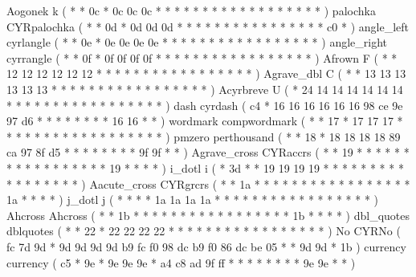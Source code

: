 \makechr Aogonek      k                 ( *  *       0c *   0c 0c 0c *     *  *  *  *  *     *  *  *  *     *  *  *     *   *  *    *  *   )
\makechr palochka     CYRpalochka       ( *  *       0d *   0d 0d 0d *     *  *  *  *  *     *  *  *  *     *  *  *     *   *  *    c0 *   )%
\makechr angle_left   cyrlangle         ( *  *       0e *   0e 0e 0e 0e    *  *  *  *  *     *  *  *  *     *  *  *     *   *  *    *  *   )%
\makechr angle_right  cyrrangle         ( *  *       0f *   0f 0f 0f 0f    *  *  *  *  *     *  *  *  *     *  *  *     *   *  *    *  *   )%
%
\makeacc Afrown       F                 ( *  *       12 12  12 12 12 12    *  *  *  *  *     *  *  *  *     *  *  *     *   *  *    *  *   )
\makeacc Agrave_dbl   C                 ( *  *       13 13  13 13 13 13    *  *  *  *  *     *  *  *  *     *  *  *     *   *  *    *  *   )
\makeacc Acyrbreve    U                 ( *  24      14 14  14 14 14 14    *  *  *  *  *     *  *  *  *     *  *  *     *   *  *    *  *   )
\makechr dash         cyrdash           ( c4 *       16 16  16 16 16 16    98 ce 9e 97 d6    *  *  *  *     *  *  *     *   16 16   *  *   )%
\makechr wordmark     compwordmark      ( *  *       17 *   17 17 17 *     *  *  *  *  *     *  *  *  *     *  *  *     *   *  *    *  *   )%
\makechr pmzero       perthousand       ( *  *       18 *   18 18 18 18    89 ca 97 8f d5    *  *  *  *     *  *  *     *   9f 9f   *  *   )%
\makechr Agrave_cross CYRaccrs          ( *  *       19 *   *  *  *  *     *  *  *  *  *     *  *  *  *     *  *  *     19  *  *    *  *   )
\makechr i_dotl       i                 ( *  3d      *  *   19 19 19 19    *  *  *  *  *     *  *  *  *     *  *  *     *   *  *    *  *   )%
\makechr Aacute_cross CYRgrcrs          ( *  *       1a *   *  *  *  *     *  *  *  *  *     *  *  *  *     *  *  *     1a  *  *    *  *   )
\makechr j_dotl       j                 ( *  *       *  *   1a 1a 1a 1a    *  *  *  *  *     *  *  *  *     *  *  *     *   *  *    *  *   )%
\makechr Ahcross      Ahcross           ( *  *       1b *   *  *  *  *     *  *  *  *  *     *  *  *  *     *  *  *     1b  *  *    *  *   )
%
\makechr dbl_quotes   dblquotes         ( *  *       22 *   22 22 22 22    *  *  *  *  *     *  *  *  *     *  *  *     *   *  *    *  *   )%
%
\makechr No           CYRNo             ( fc 7d      9d *   9d 9d 9d 9d    b9 fc f0 98 dc    b9 f0 86 dc    be 05 *     *   9d 9d   *  1b  )%
\makechr currency     currency          ( c5 *       9e *   9e 9e 9e *     a4 c8 ad 9f ff    *  *  *  *     *  *  *     *   9e 9e   *  *   )%
